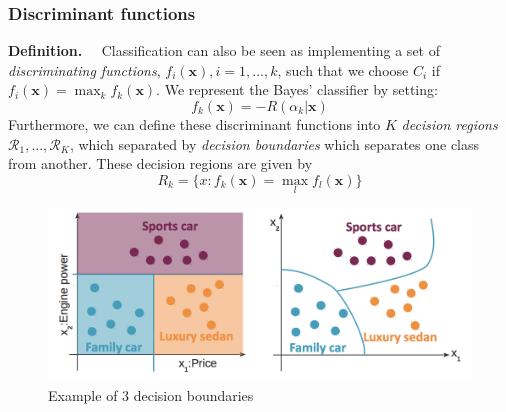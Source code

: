 \documentclass[a4paper,12pt]{article}
\newcommand{\xx}{{\bm x}}
\begin{document}
\subsubsection{Discriminant functions}
\textbf{Definition. $\quad$}Classification can also be seen as implementing a set of \textit{discriminating functions}, \linebreak $f_i(\xx), i = 1,...,k$, such that we choose $C_i$ if $f_i(\xx) = \max_k f_k(\xx)$. We represent the Bayes' classifier by setting:
\begin{equation*}
f_{k}(\xx) = - R(\alpha_k| \xx)
\end{equation*}
Furthermore, we can define these discriminant functions into $K$ \textit{decision regions} $\mathcal{R}_1,...,\mathcal{R}_K$, which separated by \textit{decision boundaries} which separates one class from another. These decision regions are given by 
$$R_{k} = \{ x : f_{k}(\xx) = \max\limits_{l}f_{l}(\xx) \}$$ 
\begin{figure}[h]
\centering
\includegraphics[scale=0.25]{boundaries}
\caption{Example of 3 decision boundaries}
    \label{fig:creditscoring}
\end{figure}
\end{document}
